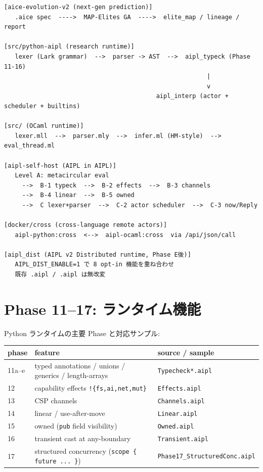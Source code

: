 \documentclass[11pt,a4paper]{article}
\begin{document}
\begin{lstlisting}
[aice-evolution-v2 (next-gen prediction)]
   .aice spec  ---->  MAP-Elites GA  ---->  elite_map / lineage / report

[src/python-aipl (research runtime)]
   lexer (Lark grammar)  -->  parser -> AST  -->  aipl_typeck (Phase 11-16)
                                                        |
                                                        v
                                          aipl_interp (actor + scheduler + builtins)

[src/ (OCaml runtime)]
   lexer.mll  -->  parser.mly  -->  infer.ml (HM-style)  -->  eval_thread.ml

[aipl-self-host (AIPL in AIPL)]
   Level A: metacircular eval
     -->  B-1 typeck  -->  B-2 effects  -->  B-3 channels
     -->  B-4 linear  -->  B-5 owned
     -->  C lexer+parser  -->  C-2 actor scheduler  -->  C-3 now/Reply

[docker/cross (cross-language remote actors)]
   aipl-python:cross  <-->  aipl-ocaml:cross  via /api/json/call

[aipl_dist (AIPL v2 Distributed runtime, Phase E後)]
   AIPL_DIST_ENABLE=1 で 8 opt-in 機能を重ね合わせ
   既存 .aipl / .aipl は無改変
\end{lstlisting}

\section{Phase 11--17: ランタイム機能}

Python ランタイムの主要 Phase と対応サンプル:

\begin{center}
\begin{tabular}{lll}
\toprule
phase & feature & source / sample \\
\midrule
11a--e & typed annotations / unions / generics / length-arrays & \texttt{Typecheck*.aipl} \\
12 & capability effects \texttt{!\{fs,ai,net,mut\}} & \texttt{Effects.aipl} \\
13 & CSP channels & \texttt{Channels.aipl} \\
14 & linear / use-after-move & \texttt{Linear.aipl} \\
15 & owned (\texttt{pub} field visibility) & \texttt{Owned.aipl} \\
16 & transient cast at any-boundary & \texttt{Transient.aipl} \\
17 & structured concurrency (\texttt{scope \{ future ... \}}) & \texttt{Phase17\_StructuredConc.aipl} \\
\bottomrule
\end{tabular}
\end{center}
\end{document}
